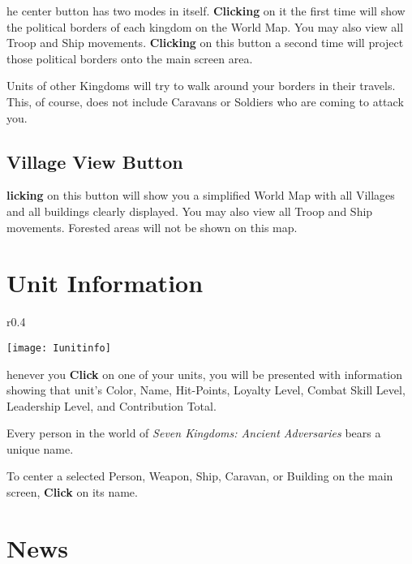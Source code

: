 he center button has two modes in itself. \textbf{Clicking} on it the first time will show the political borders of each kingdom on the World Map. You may also view all Troop and Ship movements. \textbf{Clicking} on this button a second time will project those political borders onto the main screen area.

Units of other Kingdoms will try to walk around your borders in their travels. This, of course, does not include Caravans or Soldiers who are coming to attack you.

\subsection{\textsf{Village View Button}}


\textbf{licking} on this button will show you a simplified World Map with all Villages and all buildings clearly displayed. You may also view all Troop and Ship movements. Forested areas will not be shown on this map.

\section{\textsf{Unit Information}}

\begin{wrapfigure}{r}{0.4\textwidth}
    \vspace{-20pt}
    \begin{center}
        \texttt{[image: Iunitinfo]} %
    \end{center}
    \vspace{-20pt}
\end{wrapfigure}

henever you \textbf{Click} on one of your units, you will be presented with information showing that unit’s Color, Name, Hit-Points, Loyalty Level, Combat Skill Level, Leadership Level, and Contribution Total.

Every person in the world of \textit{Seven Kingdoms: Ancient Adversaries} bears a unique name.

To center a selected Person, Weapon, Ship, Caravan, or Building on the main screen, \textbf{Click} on its name.

\section{\textsf{News}}

